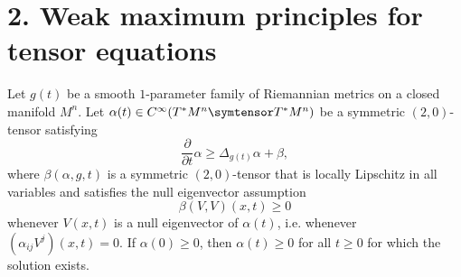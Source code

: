 \section*{2. Weak maximum principles for tensor equations}

\begin{theorem}
\label{ch04-thm-tensor-max-principle-nonnegativity}
Let \(g(t)\) be a smooth \(1\)-parameter family of Riemannian metrics on a closed manifold \(M^n\). Let \(\alpha(t)\in C^\infty(T^*M^n \symtensor T^*M^n)\) be a symmetric \((2,0)\)-tensor satisfying
\[
\frac{\partial}{\partial t}\alpha \ge \Delta_{g(t)}\alpha+\beta,
\]
where \(\beta(\alpha,g,t)\) is a symmetric \((2,0)\)-tensor that is locally Lipschitz in all variables and satisfies the null eigenvector assumption
\[
\beta(V,V)(x,t)\ge 0
\]
whenever \(V(x,t)\) is a null eigenvector of \(\alpha(t)\), i.e. whenever \((\alpha_{ij}V^j)(x,t)=0\). If \(\alpha(0)\ge 0\), then \(\alpha(t)\ge 0\) for all \(t\ge 0\) for which the solution exists.
\end{theorem}

